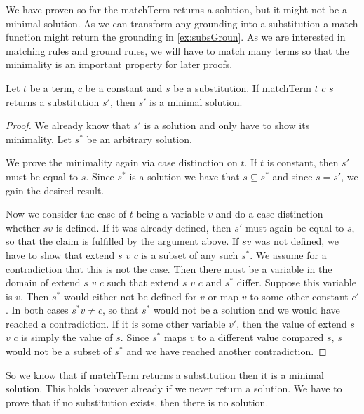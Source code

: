 We have proven so far the matchTerm returns a solution, but it might not be a minimal solution. As we can transform any grounding into a substitution a match function might return the grounding in \cref{ex:subsGroun}. As we are interested in matching rules and ground rules, we will have to match many terms so that the minimality is an important property for later proofs.

\begin{lemma}[\matchTermFindsMinimalSolution]\label{lem:matchTermMin}
    Let $t$ be a term, $c$ be a constant and $s$ be a substitution. If matchTerm $t$ $c$ $s$ returns a substitution $s'$, then $s'$ is a minimal solution.
\end{lemma}
\begin{proof}
We already know that $s'$ is a solution and only have to show its minimality. Let $s^\ast$ be an arbitrary solution.

We prove the minimality again via case distinction on $t$. If $t$ is constant, then $s'$ must be equal to $s$. Since $s^\ast$ is a solution we have that $s \subseteq s^\ast$ and since $s=s'$, we gain the desired result.

Now we consider the case of $t$ being a variable $v$ and do a case distinction whether $s v$ is defined. If it was already defined, then $s'$ must again be equal to $s$, so that the claim is fulfilled by the argument above.
If $s v$ was not defined, we have to show that extend $s$ $v$ $c$ is a subset of any such $s^\ast$. We assume for a contradiction that this is not the case. Then there must be a variable in the domain of extend $s$ $v$ $c$ such that extend $s$ $v$ $c$ and $s^\ast$ differ. Suppose this variable is $v$. Then $s^\ast$ would either not be defined for $v$ or map $v$ to some other constant $c'$. In both cases $s^\ast v \neq c$, so that $s^\ast$ would not be a solution and we would have reached a contradiction.
If it is some other variable $v'$, then the value of extend $s$ $v$ $c$ is simply the value of $s$. Since $s^\ast$ maps $v$ to a different value compared $s$, $s$ would not be a subset of $s^\ast$ and we have reached another contradiction.
\end{proof}

So we know that if matchTerm returns a substitution then it is a minimal solution. This holds however already if we never return a solution. We have to prove that if no substitution exists, then there is no solution.

